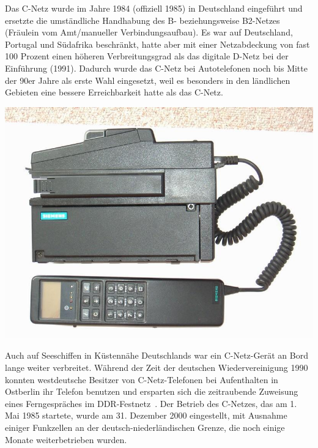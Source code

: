 \begin{multicols}{3}

Das C-Netz wurde im Jahre 1984 (offiziell 1985) in Deutschland eingeführt und ersetzte die umständliche Handhabung des B- beziehungsweise B2-Netzes (Fräulein vom Amt/manueller Verbindungsaufbau). Es war auf Deutschland, Portugal und Südafrika beschränkt, hatte aber mit einer Netzabdeckung von fast 100 Prozent einen höheren Verbreitungsgrad als das digitale D-Netz bei der Einführung (1991). Dadurch wurde das C-Netz bei Autotelefonen noch bis Mitte der 90er Jahre als erste Wahl eingesetzt, weil es besonders in den ländlichen Gebieten eine bessere Erreichbarkeit hatte als das C-Netz. 
\begin{Figure}
\includegraphics[width=\linewidth]{Kapitel/C-Netz/Grafiken/SiemensC1.jpg}
\label{fig:c-netz.mobiltelefonZwei}
\end{Figure}
Auch auf Seeschiffen in Küstennähe Deutschlands war ein C-Netz-Gerät an Bord lange weiter verbreitet. Während der Zeit der deutschen Wiedervereinigung 1990 konnten westdeutsche Besitzer von C-Netz-Telefonen bei Aufenthalten in Ostberlin ihr Telefon benutzen und ersparten sich die zeitraubende Zuweisung eines Ferngespräches im DDR-Festnetz~\cite{c-netz.3}.
Der Betrieb des C-Netzes, das am 1. Mai 1985 startete, wurde am 31. Dezember 2000 eingestellt, mit Ausnahme einiger Funkzellen an der deutsch-niederländischen Grenze, die noch einige Monate weiterbetrieben wurden.


\end{multicols}
